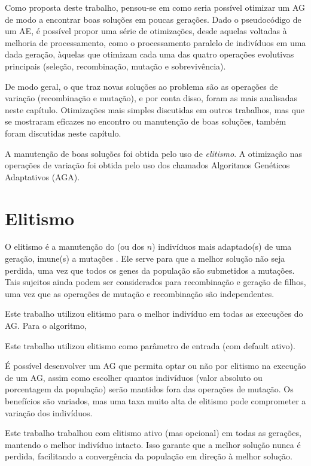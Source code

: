 \label{4_otimizacao}

Como proposta deste trabalho, pensou-se em como seria possível otimizar um AG de modo a encontrar boas soluções em poucas gerações. Dado o pseudocódigo de um AE, é possível propor uma série de otimizações, desde aquelas voltadas à melhoria de processamento, como o processamento paralelo de indivíduos em uma dada geração, àquelas que otimizam cada uma das quatro operações evolutivas principais (seleção, recombinação, mutação e sobrevivência).

De modo geral, o que traz novas soluções ao problema são as operações de variação (recombinação e mutação), e por conta disso, foram as mais analisadas neste capítulo. Otimizações mais simples discutidas em outros trabalhos, mas que se mostraram eficazes no encontro ou manutenção de boas soluções, também foram discutidas neste capítulo.

A manutenção de boas soluções foi obtida pelo uso de \emph{elitismo}. A otimização nas operações de variação foi obtida pelo uso dos chamados Algoritmos Genéticos Adaptativos (AGA).

\section{Elitismo}

O elitismo é a manutenção do (ou dos $n$) indivíduos mais adaptado(s) de uma geração, imune(s) a mutações \cite{mitchell1998introduction}. Ele serve para que a melhor solução não seja perdida, uma vez que todos os genes da população são submetidos a mutações. Tais sujeitos ainda podem ser considerados para recombinação e geração de filhos, uma vez que as operações de mutação e recombinação são independentes.

Este trabalho utilizou elitismo para o melhor indivíduo em todas as execuções do AG. Para o algoritmo, 

Este trabalho utilizou elitismo como parâmetro de entrada (com default ativo).

É possível desenvolver um AG que permita optar ou não por elitismo na execução de um AG, assim como escolher quantos indivíduos (valor absoluto ou porcentagem da população) serão mantidos fora das operações de mutação. Os benefícios são variados, mas uma taxa muito alta de elitismo pode comprometer a variação dos indivíduos.

Este trabalho trabalhou com elitismo ativo (mas opcional) em todas as gerações, mantendo o melhor indivíduo intacto. Isso garante que a melhor solução nunca é perdida, facilitando a convergência da população em direção à melhor solução.


